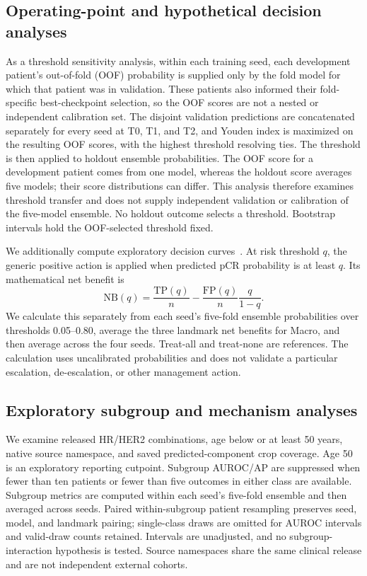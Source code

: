 \subsection{Operating-point and hypothetical decision analyses}
As a threshold sensitivity analysis, within each training seed, each development patient's out-of-fold (OOF) probability is supplied only by the fold model for which that patient was in validation. These patients also informed their fold-specific best-checkpoint selection, so the OOF scores are not a nested or independent calibration set. The disjoint validation predictions are concatenated separately for every seed at T0, T1, and T2, and Youden index is maximized on the resulting OOF scores, with the highest threshold resolving ties. The threshold is then applied to holdout ensemble probabilities. The OOF score for a development patient comes from one model, whereas the holdout score averages five models; their score distributions can differ. This analysis therefore examines threshold transfer and does not supply independent validation or calibration of the five-model ensemble. No holdout outcome selects a threshold. Bootstrap intervals hold the OOF-selected threshold fixed.

We additionally compute exploratory decision curves~\citep{vickers2006dca}. At risk threshold $q$, the generic positive action is applied when predicted pCR probability is at least $q$. Its mathematical net benefit is
\begin{equation}
 \mathrm{NB}(q)=\frac{\mathrm{TP}(q)}{n}
 -\frac{\mathrm{FP}(q)}{n}\frac{q}{1-q}.
\end{equation}
We calculate this separately from each seed's five-fold ensemble probabilities over thresholds 0.05--0.80, average the three landmark net benefits for Macro, and then average across the four seeds. Treat-all and treat-none are references. The calculation uses uncalibrated probabilities and does not validate a particular escalation, de-escalation, or other management action.

\subsection{Exploratory subgroup and mechanism analyses}
We examine released HR/HER2 combinations, age below or at least 50 years, native source namespace, and saved predicted-component crop coverage. Age 50 is an exploratory reporting cutpoint. Subgroup AUROC/AP are suppressed when fewer than ten patients or fewer than five outcomes in either class are available. Subgroup metrics are computed within each seed's five-fold ensemble and then averaged across seeds. Paired within-subgroup patient resampling preserves seed, model, and landmark pairing; single-class draws are omitted for AUROC intervals and valid-draw counts retained. Intervals are unadjusted, and no subgroup-interaction hypothesis is tested. Source namespaces share the same clinical release and are not independent external cohorts.

